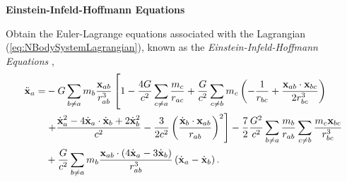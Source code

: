 \begin{exercise}
\textbf{Einstein-Infeld-Hoffmann Equations}

Obtain the Euler-Lagrange equations associated with the Lagrangian (\ref{eq:NBodySystemLagrangian}), known as the \textit{Einstein-Infeld-Hoffmann Equations} \cite{Einstein1938} ,
\begin{align}
\ddot{\textbf{x}}_a = & - G \sum_{b \neq a} m_b \frac{\textbf{x}_{ab}}{r^3_{ab}} \left[ 1 - \frac{4G}{c^2} \sum _{c \neq a} \frac{m_c}{r_{ac}} + \frac{G}{c^2} \sum_{c \neq b} m_c \left( - \frac{1}{r_{bc}} + \frac{\textbf{x}_{ab} \cdot \textbf{x}_{bc}}{2r^3_{bc}} \right) \right. \notag \\
& \left. + \frac{\dot{\textbf{x}}_a^2 - 4 \dot{\textbf{x}}_a \cdot \dot{\textbf{x}}_b + 2 \dot{\textbf{x}}_b^2}{c^2} - \frac{3}{2c^2} \left( \frac{\dot{\textbf{x}}_b \cdot \textbf{x}_{ab}}{r_{ab}} \right)^2 \right] - \frac{7}{2} \frac{G^2}{c^2} \sum _{b \neq a} \frac{m_b}{r_{ab}} \sum _{c \neq b} \frac{m_c \textbf{x}_{bc}}{r^3_{bc}} \notag \\
& + \frac{G}{c^2} \sum _{b \neq a} m_b \frac{\textbf{x}_{ab} \cdot \left(4\dot{\textbf{x}}_a - 3 \dot{\textbf{x}}_b \right)}{r^3 _{ab}} \left( \dot{\textbf{x}}_a  - \dot{\textbf{x}}_b \right).
\end{align}
\end{exercise}